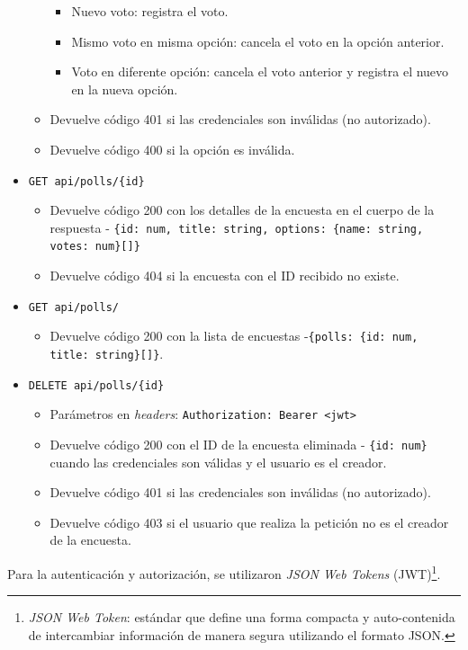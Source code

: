 \documentclass[11pt]{article}
\newcommand{\english}[1]{\textit{#1}}
\begin{document}
\begin{itemize}
\begin{itemize}
\begin{itemize}
            \item Nuevo voto: registra el voto.
            \item Mismo voto en misma opción: cancela el voto en la opción anterior.
            \item Voto en diferente opción: cancela el voto anterior y registra el nuevo en la nueva opción.
        \end{itemize}
        \item Devuelve código 401 si las credenciales son inválidas (no autorizado).
        \item Devuelve código 400 si la opción es inválida.
    \end{itemize}
    \item \lstinline|GET api/polls/{id}|
    \begin{itemize}
        \item Devuelve código 200 con los detalles de la encuesta en el cuerpo de la respuesta - \lstinline|{id: num, title: string, options: {name: string, votes: num}[]}|
        \item Devuelve código 404 si la encuesta con el ID recibido no existe.
    \end{itemize}
    \item \lstinline|GET api/polls/|
    \begin{itemize}
        \item Devuelve código 200 con la lista de encuestas -\enspace\lstinline|{polls: {id: num, title: string}[]}|.
    \end{itemize}
    \item \lstinline|DELETE api/polls/{id}|
    \begin{itemize}
        \item Parámetros en \english{headers}: \lstinline|Authorization: Bearer <jwt>|
        \item Devuelve código 200 con el ID de la encuesta eliminada - \lstinline|{id: num}| cuando las credenciales son válidas y el usuario es el creador.
        \item Devuelve código 401 si las credenciales son inválidas (no autorizado).
        \item Devuelve código 403 si el usuario que realiza la petición no es el creador de la encuesta.
    \end{itemize}
\end{itemize}

Para la autenticación y autorización, se utilizaron \english{JSON Web Tokens} (JWT)\footnote{\english{JSON Web Token}: estándar que define una forma compacta y auto-contenida de intercambiar información de manera segura utilizando el formato JSON.}.
\end{document}
